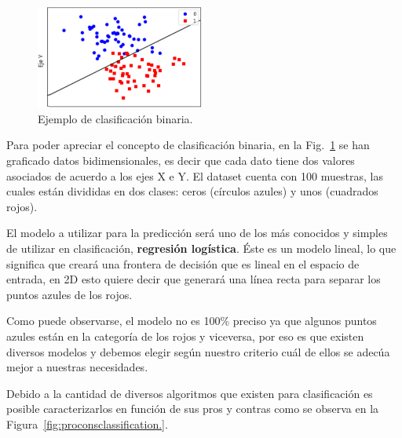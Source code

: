 \documentclass[a4paper,12pt]{article}
\begin{document}
\begin{figure}[H]
	\begin{center}				
	\includegraphics[width=0.5\textwidth]{tesis_2.png}
  	\caption{Ejemplo de clasificación binaria.}
  	\label{fig:binaryclassification.}
  	\end{center}
\end{figure}

Para poder apreciar el concepto de clasificación binaria, en la Fig.~\ref{fig:binaryclassification.}  \cite{GitHubpa25:online} se han graficado datos bidimensionales, es decir que cada dato tiene dos valores asociados de acuerdo a los ejes X e Y. El dataset cuenta con 100 muestras, las cuales están divididas en dos clases: ceros (círculos azules) y unos (cuadrados rojos). 

El modelo a utilizar para la predicción será uno de los más conocidos y simples de utilizar en clasificación, \textbf{regresión logística}. Éste es un modelo lineal, lo que significa que creará una frontera de decisión que es lineal en el espacio de entrada, en 2D esto quiere decir que generará una línea recta para separar los puntos azules de los rojos.

Como puede observarse, el modelo no es 100\% preciso ya que algunos puntos azules están en la categoría de los rojos y viceversa, por eso es que existen diversos modelos y debemos elegir según nuestro criterio cuál de ellos se adecúa mejor a nuestras necesidades.

Debido a la cantidad de diversos algoritmos que existen para clasificación es posible caracterizarlos en función de sus pros y contras como se observa en la Figura~\ref{fig:proconsclassification.}.
\end{document}
